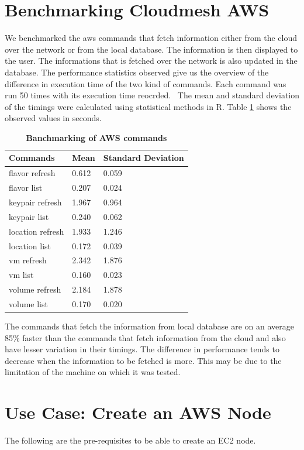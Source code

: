 \documentclass[9pt,twocolumn,twoside]{../../styles/osajnl}
\begin{document}
	
\section{Benchmarking Cloudmesh AWS}

We benchmarked the aws commands that fetch information either from the cloud over the network or from the local database. The information is then displayed to the user. The informations that is fetched over the network is also updated in the database. The performance statistics observed give us the overview of the difference in execution time of the two kind of commands. Each command was run 50 times with its execution time reocrded.  The mean and standard deviation of the timings were calculated using statistical methods in R. Table \ref{tab:awsbanchmark}  shows the observed values in seconds.

\begin{table}[h!]
	\caption{\bf Banchmarking of AWS commands}
	\begin{tabular}{ | m{3cm} | m{1.7cm} | m{2.7cm} |} 
		\hline
		Commands & Mean & Standard Deviation\\
		\hline
		flavor refresh & 0.612 & 0.059 \\
		flavor list & 0.207 & 0.024\\
		keypair refresh & 1.967 & 0.964 \\
		keypair list & 0.240 & 0.062 \\
		location refresh & 1.933 & 1.246 \\
		location list & 0.172 & 0.039 \\
		vm refresh & 2.342 & 1.876 \\
		vm list & 0.160 & 0.023 \\
		volume refresh & 2.184 & 1.878 \\
		volume list & 0.170 & 0.020 \\
		
		\hline
	\end{tabular}
	\label{tab:awsbanchmark}
\end{table}

The commands that fetch the information from local database are on an average 85\% faster than the commands that fetch information from the cloud and also have lesser variation in their timings. The difference in performance tends to decrease when the information to be fetched is more. This may be due to the limitation of the machine on which it was tested. 


\section{Use Case: Create an AWS Node}
	The following are the pre-requisites to be able to create an EC2 node.
\end{document}
